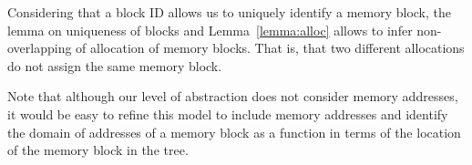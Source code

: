 

Considering that a block ID allows us to uniquely identify a memory block, the lemma on uniqueness of blocks and Lemma~\ref{lemma:alloc} allows to infer non-overlapping of allocation of memory blocks. That is, that two different allocations do not assign the same memory block.

Note that although our level of abstraction does not consider memory addresses, it would be easy to refine this model to include memory addresses and identify the domain of addresses of a memory block as a function in terms of the location of the memory block in the tree.

